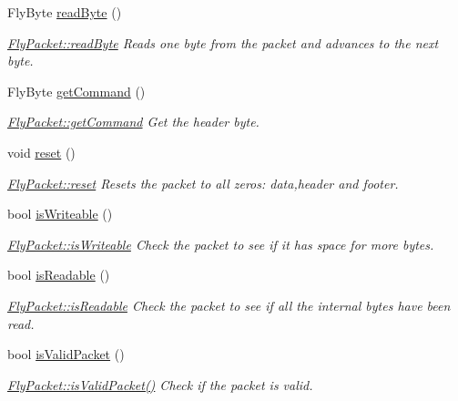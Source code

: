 \begin{DoxyCompactItemize}
Fly\+Byte \hyperlink{class_fly_packet_af3e863f81ee5de3fb73ec200efac0924}{read\+Byte} ()
\begin{DoxyCompactList}\small\item\em \hyperlink{class_fly_packet_af3e863f81ee5de3fb73ec200efac0924}{Fly\+Packet\+::read\+Byte} Reads one byte from the packet and advances to the next byte. \end{DoxyCompactList}\item 
Fly\+Byte \hyperlink{class_fly_packet_af0989edccb2cff9652f5a3c38fd210a2}{get\+Command} ()
\begin{DoxyCompactList}\small\item\em \hyperlink{class_fly_packet_af0989edccb2cff9652f5a3c38fd210a2}{Fly\+Packet\+::get\+Command} Get the header byte. \end{DoxyCompactList}\item 
\hypertarget{class_fly_packet_aaac4cf49c1ef150d0e4e59c2377cedd3}{}\label{class_fly_packet_aaac4cf49c1ef150d0e4e59c2377cedd3} 
void \hyperlink{class_fly_packet_aaac4cf49c1ef150d0e4e59c2377cedd3}{reset} ()
\begin{DoxyCompactList}\small\item\em \hyperlink{class_fly_packet_aaac4cf49c1ef150d0e4e59c2377cedd3}{Fly\+Packet\+::reset} Resets the packet to all zeros\+: data,header and footer. \end{DoxyCompactList}\item 
bool \hyperlink{class_fly_packet_a1e63a54895660739a5232b5b546fcf07}{is\+Writeable} ()
\begin{DoxyCompactList}\small\item\em \hyperlink{class_fly_packet_a1e63a54895660739a5232b5b546fcf07}{Fly\+Packet\+::is\+Writeable} Check the packet to see if it has space for more bytes. \end{DoxyCompactList}\item 
bool \hyperlink{class_fly_packet_a9c1a141b4b44004015618da46829200d}{is\+Readable} ()
\begin{DoxyCompactList}\small\item\em \hyperlink{class_fly_packet_a9c1a141b4b44004015618da46829200d}{Fly\+Packet\+::is\+Readable} Check the packet to see if all the internal bytes have been read. \end{DoxyCompactList}\item 
bool \hyperlink{class_fly_packet_a71175af24ccf498579c804aa21500db5}{is\+Valid\+Packet} ()
\begin{DoxyCompactList}\small\item\em \hyperlink{class_fly_packet_a71175af24ccf498579c804aa21500db5}{Fly\+Packet\+::is\+Valid\+Packet()} Check if the packet is valid. \end{DoxyCompactList}\item 

\end{DoxyCompactItemize}
